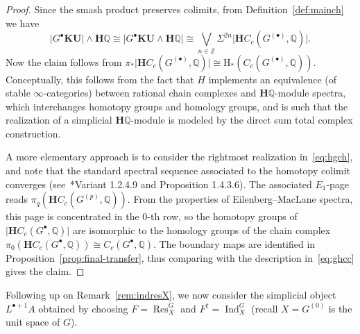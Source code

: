 \documentclass[a4paper,reqno]{amsart}
\theoremstyle{plain}
\theoremstyle{definition}
\theoremstyle{remark}
\numberwithin{equation}{section}
\newcommand{\rH}{\mathrm{H}}
\newcommand{\dQ}{\mathbb{Q}}
\newcommand{\dZ}{\mathbb{Z}}
\newcommand{\bH}{\mathbf{H}}
\newcommand{\gr}[1]{\lvert #1\rvert}
\newcommand{\KU}{\mathbf{KU}}
\DeclareMathOperator{\Ind}{Ind}
\DeclareMathOperator{\Res}{Res}
\begin{document}
\begin{proof}
Since the smash product preserves colimits, from Definition~\ref{def:mainch} we have 
\begin{equation}\label{eq:hgch}
\gr{G^{\bullet}\KU}\wedge \bH\dQ \cong \gr{G^{\bullet}\KU\wedge \bH\dQ}\cong \bigvee_{n\in\dZ} \Sigma^{2n}\gr{ \bH C_c(G^{(\bullet)},\dQ)}.
\end{equation}
Now the claim follows from $\pi_*\gr{\bH C_c(G^{(\bullet)},\dQ)}\cong \rH_*(C_c(G^{(\bullet)},\dQ))$.
Conceptually, this follows from the fact that $H$ implements an equivalence (of stable $\infty$-categories) between rational chain complexes and $\bH\dQ$-module spectra, which interchanges homotopy groups and homology groups, and is such that the realization of a simplicial $\bH\dQ$-module is modeled by the direct sum total complex construction. 

A more elementary approach is to consider the rightmost realization in~\eqref{eq:hgch}, and note that the standard spectral sequence associated to the homotopy colimit converges (see~\cite{lur:ha}*{Variant 1.2.4.9 and Proposition 1.4.3.6}). The associated $E_1$-page reads $\pi_q(\bH C_c(G^{(p)},\dQ))$. From the properties of Eilenberg--MacLane spectra, this page is concentrated in the $0$-th row, so the homotopy groups of $\gr{\bH C_c(G^{\bullet},\dQ)}$ are isomorphic to the homology groups of the chain complex $\pi_0(\bH C_c(G^{\bullet},\dQ))\cong C_c(G^{\bullet},\dQ)$.
The boundary maps are identified in Proposition~\ref{prop:final-transfer}, thus comparing with the description in~\eqref{eq:ghcc} gives the claim.
\end{proof}

Following up on Remark~\ref{rem:indresX}, we now consider the simplicial object $L^{\bullet+1} A$ obtained by choosing $F=\Res^G_X$ and $F^\dagger=\Ind_X^G$ (recall $X=G^{(0)}$ is the unit space of $G$).
\end{document}
